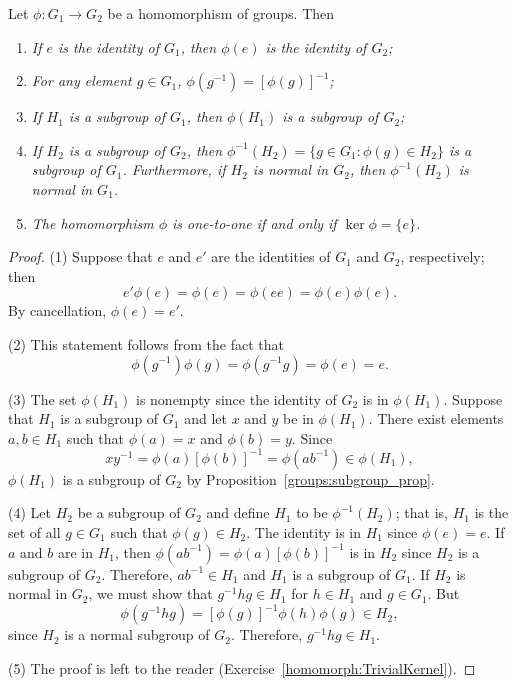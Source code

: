  
\begin{proposition}\label{HomorphismSubgroupProp}
Let $\phi : G_1 \rightarrow G_2$ be a homomorphism of groups. Then 
\begin{enumerate}
 
\rm \item \it
If $e$ is the identity of $G_1$, then $\phi( e)$ is the identity of
$G_2$;  
 
\rm \item \it
For any element $g \in G_1$, $\phi( g^{-1}) = [\phi( g )]^{- 1}$;
 
\rm \item \it
If $H_1$ is a subgroup of $G_1$, then $\phi( H_1 )$ is a subgroup of
$G_2$;
 
\rm \item \it
If $H_2$ is a  subgroup of $G_2$, then $\phi^{-1}(H_2) = \{ g \in G _1:
\phi(g) \in H_2 \}$ is a subgroup of $G_1$. Furthermore, if $H_2$ is
normal in $G_2$, then $\phi^{-1}(H_2)$ is normal in $G_1$. 


\rm \item \it
The homomorphism $\phi$ is one-to-one if and only if $\ker \phi = \{ e \}$.

 
\end{enumerate}
\end{proposition}
 
 
\begin{proof}
(1)
Suppose that $e$ and $e'$ are the identities of $G_1$ and $G_2$,
respectively; then
\[
e' \phi(e) = \phi(e) = \phi(e e) = \phi(e) \phi(e).
\]
By cancellation, $\phi(e) = e'$.
 
 
(2)
This statement follows from the fact that
\[
\phi( g^{-1}) \phi(g) = \phi(g^{-1} g) = \phi(e) = e.
\]
 
 
(3)
The set $\phi(H_1)$ is nonempty since the identity of $G_2$ is in
$\phi(H_1)$.
Suppose that $H_1$ is a subgroup of $G_1$ and let $x$ and $y$ be in
$\phi(H_1)$. There exist elements $a, b \in H_1$ such that $\phi(a) =
x$ and $\phi(b)=y$. Since 
\[
xy^{-1} = \phi(a)[ \phi(b)]^{-1} = \phi(a b^{-1} ) \in \phi(H_1),
\]
$\phi(H_1)$ is a subgroup of $G_2$ by Proposition~\ref{groups:subgroup_prop}.
 
 
(4)
Let $H_2$ be a subgroup of $G_2$ and define $H_1$ to be
$\phi^{-1}(H_2)$; that is, $H_1$ is the set of all $g \in G_1$ such
that $\phi(g) \in H_2$.  The identity is in $H_1$ since $\phi(e) = e$.
If $a$ and $b$ are in $H_1$, then $\phi(ab^{-1}) = \phi(a)[ \phi(b)
]^{-1}$ is in $H_2$ since $H_2$ is a subgroup of $G_2$.  Therefore,
$ab^{-1} \in H_1$ and $H_1$ is a subgroup of $G_1$. If $H_2$ is normal
in $G_2$, we must show that $g^{-1} h g \in H_1$ for $h \in H_1$ and
$g \in G_1$. But 
\[
\phi( g^{-1} h g) = [ \phi(g) ]^{-1} \phi( h ) \phi( g ) \in
H_2,
\]
since $H_2$ is a normal subgroup of $G_2$.  Therefore, $g^{-1}hg \in
H_1$.

(5) The proof is left to the reader (Exercise~\ref{homomorph:TrivialKernel}).
\end{proof}
 
